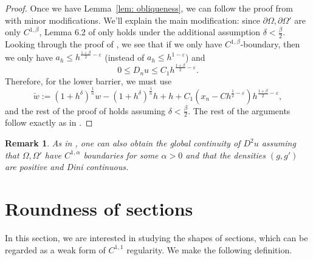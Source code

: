 \documentclass[12pt,reqno]{amsart}
\newtheorem{remark}{Remark}[section]
\newcommand{\eps}{\varepsilon}
\numberwithin{equation}{section}
\begin{document}
    \begin{proof}
        Once we have Lemma~\ref{lem: obliqueness}, we can follow the proof from \cite[Section 6]{Chen-Liu-Wang} with minor modifications. We'll explain the main modification: since $\partial\Omega, \partial\Omega'$ are only $C^{1, \beta}$, Lemma 6.2 of \cite{Chen-Liu-Wang} only holds under the additional assumption $\delta<\frac{\beta}{2}$. Looking through the proof of \cite[Lemma 6.2]{Chen-Liu-Wang}, we see that if we only have $C^{1, \beta}$-boundary, then we only have $a_h\leq h^{\frac{1+\beta}{2}-\eps}$ (instead of $a_h\leq h^{1-\eps}$) and
        \[0\leq D_nu\leq C_1h^{\frac{1+\beta}{2}-\eps}.\]
        Therefore, for the lower barrier, we must use
        \[\check w := (1+h^{\delta})^{\frac 1 n}w-(1+h^{\delta})^{\frac 1 n}h+h+C_1(x_n-Ch^{\frac 1 2 -\eps})h^{\frac{1+\beta}{2}-\eps},\] 
        and the rest of the proof of \cite[Lemma 6.2]{Chen-Liu-Wang} holds assuming $\delta<\frac{\beta}{2}$. 
        The rest of the arguments follow exactly as in \cite[Section 6]{Chen-Liu-Wang}. 
    \end{proof}
    \begin{remark}
        As in \cite[Theorem 6.1]{Chen-Liu-Wang}, one can also obtain the global continuity of $D^2u$ assuming that $\Omega,\Omega'$ have $C^{1,\alpha}$ boundaries for some $\alpha>0$ and that the densities $(g,g')$ are positive and Dini continuous.
    \end{remark}

\section{Roundness of sections}\label{sec: roundness}

In this section, we are interested in studying the shapes of sections, which can be regarded as a weak form of $C^{1, 1}$ regularity.  We make the following definition.
\end{document}
